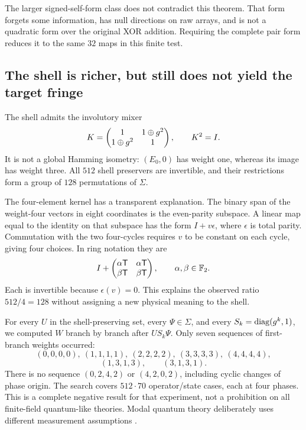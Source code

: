 The larger signed-self-form class does not contradict this theorem. That form forgets some information, has null directions on raw arrays, and is not a quadratic form over the original XOR addition. Requiring the complete pair form reduces it to the same $32$ maps in this finite test.

\subsection{The shell is richer, but still does not yield the target fringe}
The shell admits the involutory mixer
\begin{equation}
 K=\begin{pmatrix}1&1\oplus g^2\\1\oplus g^2&1\end{pmatrix},\qquad K^2=I.
\end{equation}
It is not a global Hamming isometry: $(E_0,0)$ has weight one, whereas its image has weight three. All $512$ shell preservers are invertible, and their restrictions form a group of $128$ permutations of $\Sigma$.

The four-element kernel has a transparent explanation. The binary span of the weight-four vectors in eight coordinates is the even-parity subspace. A linear map equal to the identity on that subspace has the form $I+v\epsilon$, where $\epsilon$ is total parity. Commutation with the two four-cycles requires $v$ to be constant on each cycle, giving four choices. In ring notation they are
\begin{equation}
 I+\begin{pmatrix}\alpha\mathsf T&\alpha\mathsf T\\\beta\mathsf T&\beta\mathsf T\end{pmatrix},
 \qquad \alpha,\beta\in\mathbb F_2.
\end{equation}
Each is invertible because $\epsilon(v)=0$. This explains the observed ratio $512/4=128$ without assigning a new physical meaning to the shell.

For every $U$ in the shell-preserving set, every $\Psi\in\Sigma$, and every $S_k=\operatorname{diag}(g^k,1)$, we computed $W$ branch by branch after $US_k\Psi$. Only seven sequences of first-branch weights occurred:
\begin{equation}
 (0,0,0,0),\ (1,1,1,1),\ (2,2,2,2),\ (3,3,3,3),\ (4,4,4,4),
\end{equation}
\begin{equation}
 (1,3,1,3),\qquad (3,1,3,1).
\end{equation}
There is no sequence $(0,2,4,2)$ or $(4,2,0,2)$, including cyclic changes of phase origin. The search covers $512\cdot70$ operator/state cases, each at four phases. This is a complete negative result for that experiment, not a prohibition on all finite-field quantum-like theories. Modal quantum theory deliberately uses different measurement assumptions \cite{modal}.

